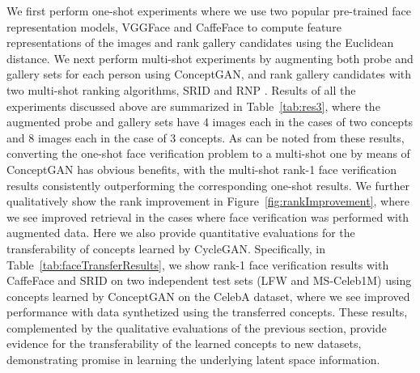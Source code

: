 \documentclass[10pt,twocolumn,letterpaper]{article}
\begin{document}
We first perform one-shot experiments where we use two popular pre-trained face representation models, VGGFace \cite{vggface} and CaffeFace \cite{caffeface} to compute feature representations of the images and rank gallery candidates using the Euclidean distance. We next perform multi-shot experiments by augmenting both probe and gallery sets for each person using ConceptGAN, and rank gallery candidates with two multi-shot ranking algorithms, SRID \cite{srid,karanam2016systematic} and RNP \cite{rnp}. Results of all the experiments discussed above are summarized in Table~\ref{tab:res3}, where the augmented probe and gallery sets have 4 images each in the cases of two concepts and 8 images each in the case of 3 concepts. As can be noted from these results, converting the one-shot face verification problem to a multi-shot one by means of ConceptGAN has obvious benefits, with the multi-shot rank-1 face verification results consistently outperforming the corresponding one-shot results. We further qualitatively show the rank improvement in Figure~\ref{fig:rankImprovement}, where we see improved retrieval in the cases where face verification was performed with augmented data. %
Here we also provide quantitative evaluations for the transferability of concepts learned by CycleGAN. Specifically, in Table~\ref{tab:faceTransferResults}, we show rank-1 face verification results with CaffeFace and SRID on two independent test sets (LFW and MS-Celeb1M) using concepts learned by ConceptGAN on the CelebA dataset, where we see improved performance with data synthetized using the transferred concepts.  These results, complemented by the qualitative evaluations of the previous section, provide evidence for the transferability of the learned concepts to new datasets, demonstrating promise in learning the underlying latent space information.
\end{document}
